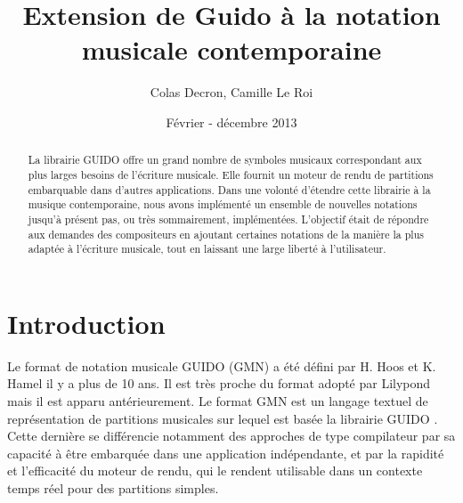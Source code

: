 \documentclass[a4paper,10pt,twocolumn]{article}
\author{Colas Decron, Camille Le Roi}
\title{\centering Extension de Guido à la notation musicale contemporaine}
\date{ Février - décembre 2013}
\begin{document}

\maketitle

\begin{abstract}

La librairie GUIDO offre un grand nombre de symboles musicaux correspondant aux plus larges besoins de l'écriture musicale. Elle fournit un moteur de rendu de partitions embarquable dans d'autres applications. Dans une volonté d'étendre cette librairie à la musique contemporaine, nous avons implémenté un ensemble de nouvelles notations jusqu'à présent pas, ou très sommairement, implémentées. L'objectif était de répondre aux demandes des compositeurs en ajoutant certaines notations de la manière la plus adaptée à l'écriture musicale, tout en laissant une large liberté à l'utilisateur.

\end{abstract}

\section{Introduction}

% 



Le format de notation musicale GUIDO (GMN) \cite{ref6} \cite{ref5} a été défini par H. Hoos et K. Hamel il y a plus de 10 ans. Il est très proche du format adopté par Lilypond \cite{ref7} mais il est apparu antérieurement. Le format GMN est un langage textuel de représentation de partitions musicales %
sur lequel est basée %
la librairie GUIDO \cite{ref5}. Cette dernière %
se différencie notamment des approches de type compilateur par sa capacité à être embarquée dans une application indépendante, et par la rapidité et l'efficacité du moteur de rendu, qui le rendent utilisable dans un contexte temps réel pour des partitions simples.
\end{document}
